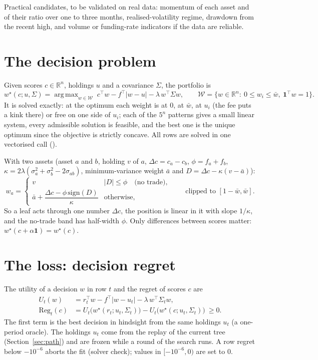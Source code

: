 \documentclass[11pt,a4paper]{article}
\newcommand{\code}[1]{\texttt{\detokenize{#1}}}
\DeclareMathOperator*{\argmax}{arg\,max}
\newcommand{\R}{\mathbb{R}}
\newcommand{\1}{\mathbf{1}}
\newcommand{\Reg}{\mathrm{Reg}}
\newcommand{\W}{\mathcal{W}}
\begin{document}
Practical candidates, to be validated on real data: momentum of each asset and of their ratio over one to three months, realised-volatility regime, drawdown from the recent high, and volume or funding-rate indicators if the data are reliable.

\section{The decision problem}\label{sec:decision}
Given scores $c\in\R^n$, holdings $u$ and a covariance $\Sigma$, the portfolio is
\begin{equation}\label{eq:opt}
w^\star(c;u,\Sigma)=\argmax_{w\in\W}\;c^\top w-f^\top|w-u|-\lambda\,w^\top\Sigma w,
\qquad \W=\{w\in\R^n:\ 0\le w_i\le\bar w,\ \1^\top w=1\}.
\end{equation}
It is solved exactly: at the optimum each weight is at $0$, at $\bar w$, at $u_i$ (the fee puts a kink there) or free on one side of $u_i$; each of the $5^n$ patterns gives a small linear system, every admissible solution is feasible, and the best one is the unique optimum since the objective is strictly concave. All rows are solved in one vectorised call (\code{PortfolioOptimizer.solve}).

With two assets (asset $a$ and $b$, holding $v$ of $a$, $\Delta c=c_a-c_b$, $\phi=f_a+f_b$, $\kappa=2\lambda(\sigma_a^2+\sigma_b^2-2\sigma_{ab})$, minimum-variance weight $\bar a$ and $D=\Delta c-\kappa(v-\bar a)$):
\begin{equation}\label{eq:twoasset}
w_a=\begin{cases} v & |D|\le\phi\quad\text{(no trade)},\\[2pt] \bar a+\dfrac{\Delta c-\phi\,\mathrm{sign}(D)}{\kappa} & \text{otherwise,}\end{cases}\qquad\text{clipped to }[1-\bar w,\bar w].
\end{equation}
So a leaf acts through one number $\Delta c$, the position is linear in it with slope $1/\kappa$, and the no-trade band has half-width $\phi$. Only differences between scores matter: $w^\star(c+\alpha\1)=w^\star(c)$.

\section{The loss: decision regret}\label{sec:loss}
The utility of a decision $w$ in row $t$ and the regret of scores $c$ are
\begin{align}
U_t(w)&=r_t^\top w-f^\top|w-u_t|-\lambda\,w^\top\Sigma_t w,\label{eq:utility}\\
\Reg_t(c)&=U_t\big(w^\star(r_t;u_t,\Sigma_t)\big)-U_t\big(w^\star(c;u_t,\Sigma_t)\big)\ \ge0 .\label{eq:regret}
\end{align}
The first term is the best decision in hindsight from the same holdings $u_t$ (a one-period oracle). The holdings $u_t$ come from the replay of the current tree (Section~\ref{sec:path}) and are frozen while a round of the search runs. A row regret below $-10^{-6}$ aborts the fit (solver check); values in $[-10^{-6},0)$ are set to $0$.
\end{document}
